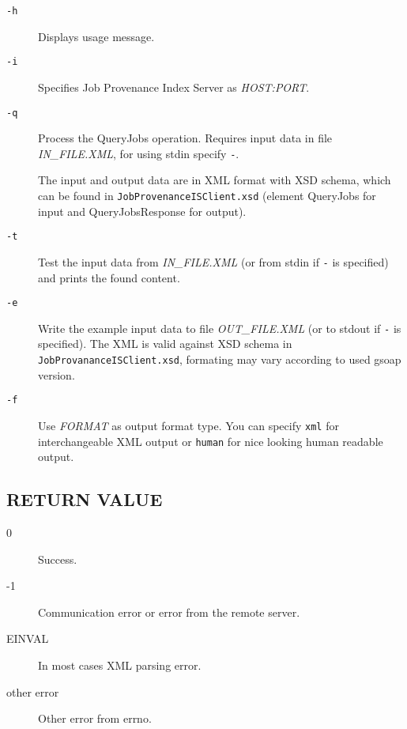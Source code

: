 \begin{description}
\item[{{\texttt{{-h}}}}]\null{}
Displays usage message.
\item[{{\texttt{{-i}}}}]\null{}
Specifies Job Provenance Index Server as {\ttfamily\itshape{{HOST:PORT}}}.
\item[{{\texttt{{-q}}}}]\null{}
Process the QueryJobs operation. Requires input data in file {\ttfamily\itshape{{IN\_FILE.XML}}}, for using stdin specify {\texttt{{-}}}.

The input and output data are in XML format with XSD schema, which can be found in {\texttt{{JobProvenanceISClient.\dbz{}xsd}}} (element QueryJobs for input and QueryJobsResponse for output).
\item[{{\texttt{{-t}}}}]\null{}
Test the input data from {\ttfamily\itshape{{IN\_FILE.XML}}} (or from stdin if {\texttt{{-}}} is specified) and prints the found content.
\item[{{\texttt{{-e}}}}]\null{}
Write the example input data to file {\ttfamily\itshape{{OUT\_FILE.XML}}} (or to stdout if {\texttt{{-}}} is specified). The XML is valid against XSD schema in {\texttt{{JobProvananceISClient.\dbz{}xsd}}}, formating may vary according to used gsoap version.
\item[{{\texttt{{-f}}}}]\null{}
Use {\ttfamily\itshape{{FORMAT}}} as output format type. You can specify {\texttt{{xml}}} for interchangeable XML output or {\texttt{{human}}} for nice looking human readable output.
\end{description}
\noindent 
\subsection*{RETURN VALUE}
\label{id2417767}

\begin{description}
\item[{0}]\null{}
Success.
\item[{-1}]\null{}
Communication error or error from the remote server.
\item[{EINVAL}]\null{}
In most cases XML parsing error.
\item[{other error}]\null{}
Other error from errno.
\end{description}
\noindent 

